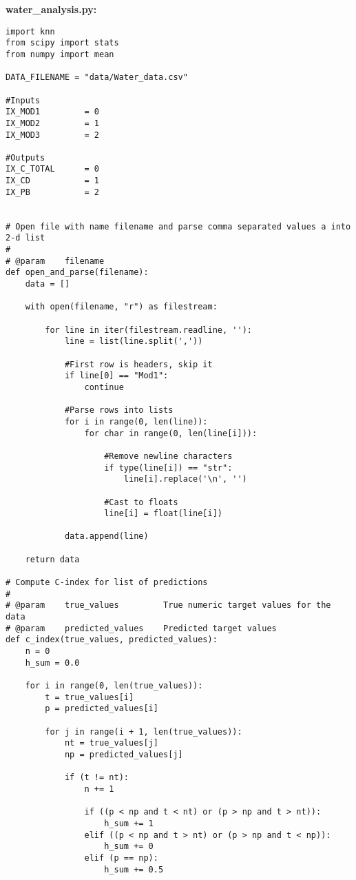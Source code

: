 \documentclass[a4paper]{article}
\begin{document}
\textbf{water\_analysis.py:}\\
\footnotesize
\begin{lstlisting}
import knn 
from scipy import stats
from numpy import mean

DATA_FILENAME = "data/Water_data.csv"

#Inputs
IX_MOD1         = 0
IX_MOD2         = 1
IX_MOD3         = 2

#Outputs
IX_C_TOTAL      = 0
IX_CD           = 1
IX_PB           = 2


# Open file with name filename and parse comma separated values a into 2-d list
#
# @param    filename
def open_and_parse(filename):
    data = []

    with open(filename, "r") as filestream:

        for line in iter(filestream.readline, ''):
            line = list(line.split(','))

            #First row is headers, skip it
            if line[0] == "Mod1":
                continue

            #Parse rows into lists
            for i in range(0, len(line)):
                for char in range(0, len(line[i])):

                    #Remove newline characters
                    if type(line[i]) == "str":
                        line[i].replace('\n', '')

                    #Cast to floats
                    line[i] = float(line[i])

            data.append(line)

    return data

# Compute C-index for list of predictions
#
# @param    true_values         True numeric target values for the data
# @param    predicted_values    Predicted target values
def c_index(true_values, predicted_values):
    n = 0
    h_sum = 0.0

    for i in range(0, len(true_values)):
        t = true_values[i]
        p = predicted_values[i]
        
        for j in range(i + 1, len(true_values)):
            nt = true_values[j]
            np = predicted_values[j]
        
            if (t != nt):
                n += 1
                
                if ((p < np and t < nt) or (p > np and t > nt)):
                    h_sum += 1
                elif ((p < np and t > nt) or (p > np and t < np)):
                    h_sum += 0
                elif (p == np):
                    h_sum += 0.5
    

\end{lstlisting}
\end{document}
